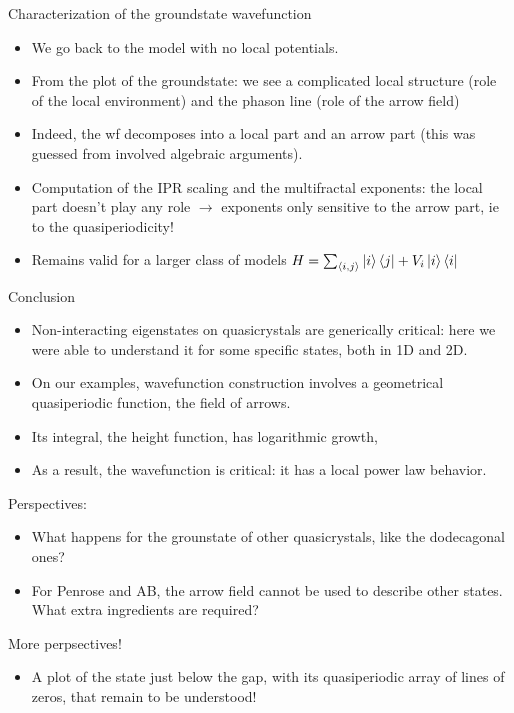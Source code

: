 \documentclass[xcolor=x11names,compress,professionalfonts]{beamer}
\renewcommand{\(}{\begin{columns}}
\renewcommand{\)}{\end{columns}}
\newcommand{\<}[1]{\begin{column}{#1}}
\renewcommand{\>}{\end{column}}
\begin{document}
\begin{frame}{Characterization of the groundstate wavefunction}
\begin{itemize}
	\item We go back to the model with no local potentials. 
	\item From the plot of the groundstate: we see a complicated local structure (role of the local environment) and the phason line (role of the arrow field)
	\item Indeed, the wf decomposes into a local part and an arrow part (this was guessed from involved algebraic arguments).
	\item Computation of the IPR scaling and the multifractal exponents: the local part doesn't play any role $\rightarrow$ exponents only sensitive to the arrow part, ie to the quasiperiodicity!
	\item Remains valid for a larger class of models $H = \sum_{\langle i, j \rangle} \ket{i} \bra{j} + V_i \ket{i} \bra{i} $
\end{itemize}
\end{frame}

\begin{frame}{Conclusion}
\begin{itemize}
	\item Non-interacting eigenstates on quasicrystals are generically critical: here we were able to understand it for some specific states, both in 1D and 2D.
	\item On our examples, wavefunction construction involves a geometrical quasiperiodic function, the field of arrows.
	\item Its integral, the height function, has logarithmic growth,
	\item As a result, the wavefunction is critical: it has a local power law behavior.
\end{itemize}
Perspectives:
\begin{itemize}
	\item What happens for the grounstate of other quasicrystals, like the dodecagonal ones?
	\item For Penrose and AB, the arrow field cannot be used to describe other states. What extra ingredients are required?
\end{itemize}
\end{frame}

\begin{frame}{More perpsectives!}
\begin{itemize}
	\item A plot of the state just below the gap, with its quasiperiodic array of lines of zeros, that remain to be understood!
\end{itemize}
\end{frame}
\end{document}

